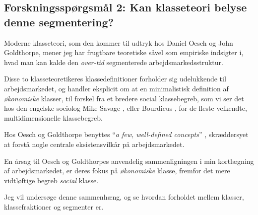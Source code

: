 \subsection[Forskningsspørgsmål 2]{Forskningsspørgsmål 2:  \linebreak
\small Kan klasseteori belyse denne segmentering?}


Moderne klasseteori, som den kommer til udtryk hos Daniel Oesch og John Goldthorpe, mener jeg har frugtbare teoretiske såvel som empiriske indsigter i, hvad man kan kalde den \emph{over-tid} segmenterede arbejdsmarkedsstruktur.

Disse to klasseteoretikeres klassedefinitioner forholder sig udelukkende til arbejdsmarkedet, og handler eksplicit om at en minimalistisk definition af \emph{økonomiske} klasser, til forskel fra et bredere social klassebegreb, som vi ser det hos den engelske sociolog Mike Savage \citeyear{Savage2013}, eller Bourdieus \citeyear{Bourdieu1986}, for de fleste velkendte, multidimensionelle klassebegreb. 

Hos Oesch og Goldthorpe benyttes “\emph{a few, well-defined concepts}” \parencite[382]{GoldthorpeMarshall1992}, skræddersyet at forstå nogle centrale eksistensvilkår på arbejdsmarkedet.

En årsag til Oesch og Goldthorpes anvendelig sammenligningen i min kortlægning af arbejdsmarkedet, er deres fokus på \emph{økonomiske} klasse, fremfor det mere vidtløftige begreb \emph{social} klasse. 

Jeg vil undersøge denne sammenhæng, og se hvordan forholdet mellem klasser, klassefraktioner og segmenter er. 









